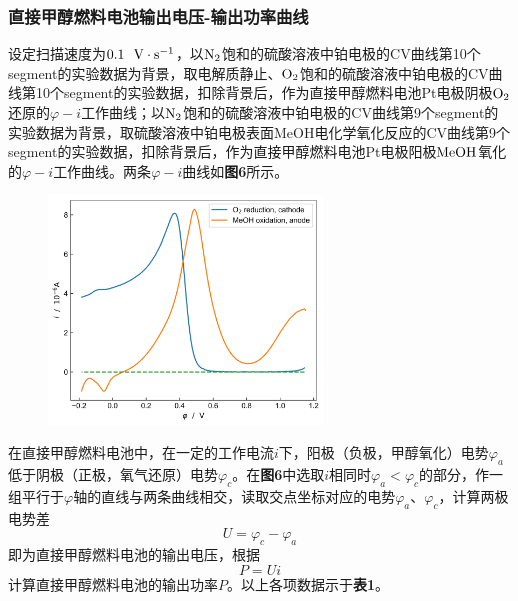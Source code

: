 \documentclass[12pt]{article}
\begin{document}
\subsubsection{直接甲醇燃料电池输出电压-输出功率曲线}
设定扫描速度为$0.1\ \ {\rm V\cdot s^{-1}}$，以${\rm N_{2}}$饱和的硫酸溶液中铂电极的CV曲线第10个segment的实验数据为背景，取电解质静止、${\rm O_{2}}$饱和的硫酸溶液中铂电极的CV曲线第10个segment的实验数据，扣除背景后，作为直接甲醇燃料电池Pt电极阴极$\rm O_{2}$还原的$\varphi-i$工作曲线；以${\rm N_{2}}$饱和的硫酸溶液中铂电极的CV曲线第9个segment的实验数据为背景，取硫酸溶液中铂电极表面MeOH电化学氧化反应的CV曲线第9个segment的实验数据，扣除背景后，作为直接甲醇燃料电池Pt电极阳极$\rm MeOH$氧化的$\varphi-i$工作曲线。两条$\varphi-i$曲线如\textbf{图6}所示。
 \begin{figure}[h]
	\centering
	\includegraphics[width=0.65\textwidth]{6.jpg}
\end{figure}
\par
在直接甲醇燃料电池中，在一定的工作电流$i$下，阳极（负极，甲醇氧化）电势$\varphi_{a}$
低于阴极（正极，氧气还原）电势$\varphi_{c}$。在\textbf{图6}中选取$i$相同时$\varphi_{a}<\varphi_{c}$的部分，作一组平行于$\varphi$轴的直线与两条曲线相交，读取交点坐标对应的电势$\varphi_{a}$、$\varphi_{c}$，计算两极电势差
$$
U=\varphi_{c}-\varphi_{a}
$$
即为直接甲醇燃料电池的输出电压，根据
$$
P=Ui
$$
计算直接甲醇燃料电池的输出功率$P$。以上各项数据示于\textbf{表1}。
\end{document}
